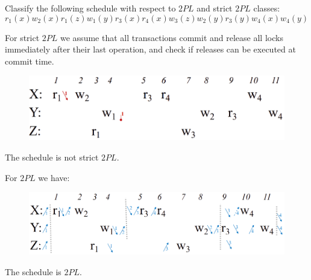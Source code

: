 \documentclass[12pt, a4paper]{report}
\newtheorem[style=M,bodystyle=\normalfont]{theorem}{Theorem}
\newtheorem[style=M,bodystyle=\normalfont]{corollary}{Corollary}
\newtheorem[style=M,bodystyle=\normalfont]{lemma}{Lemma}
\newtheorem[style=M,bodystyle=\normalfont]{definition}{Definition}
\begin{document}
    \begin{Exercise}[label=10]
        Classify the following schedule with respect to $2PL$ and strict $2PL$ classes: 
        \[r_1(x) w_2(x) r_1(z) w_1(y) r_3(x) r_4(x) w_3(z) w_2(y) r_3(y) w_4(x) w_4(y)\]
    \end{Exercise}
    \begin{Answer}[ref=10]
        For strict $2PL$ we assume that all transactions commit and release all locks immediately after their last operation, and check if releases can be executed at commit time.
        \begin{figure}[H]
            \centering
            \includegraphics[width=1\linewidth]{images/2PL7.png}
        \end{figure}
        The schedule is not strict $2PL$.

        For $2PL$ we have: 
        \begin{figure}[H]
            \centering
            \includegraphics[width=1\linewidth]{images/2PL8.png}
        \end{figure}
        The schedule is $2PL$. 
    \end{Answer}

    \newpage
\end{document}
